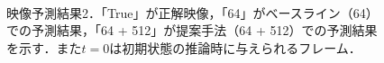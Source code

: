 \begin{figure}[tp]
    \centering
    \\
    \caption[映像予測結果2]{映像予測結果2．「True」が正解映像，「64」がベースライン（64）での予測結果，「64 + 512」が提案手法（64 + 512）での予測結果を示す．また$t = 0$は初期状態の推論時に与えられるフレーム．}
    \label{fig:compare_cd}
\end{figure}

